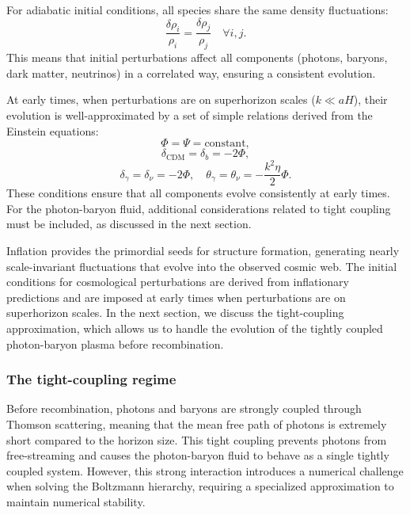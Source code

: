 \documentclass{aa}
\begin{document}
For adiabatic initial conditions, all species share the same density fluctuations:
\begin{equation}
\frac{\delta\rho_i}{\rho_i} = \frac{\delta\rho_j}{\rho_j} \quad \forall i, j.
\end{equation}
This means that initial perturbations affect all components (photons, baryons, dark matter, neutrinos) in a correlated way, ensuring a consistent evolution.

At early times, when perturbations are on superhorizon scales ($ k \ll aH $), their evolution is well-approximated by a set of simple relations derived from the Einstein equations:
\begin{equation}
\Phi = \Psi = \text{constant},
\end{equation}\begin{equation}
\delta_{\text{CDM}} = \delta_b = -2\Phi,
\end{equation}\begin{equation}
\delta_\gamma = \delta_\nu = -2\Phi, \quad \theta_\gamma = \theta_\nu = -\frac{k^2 \eta}{2} \Phi.
\end{equation}
These conditions ensure that all components evolve consistently at early times. For the photon-baryon fluid, additional considerations related to tight coupling must be included, as discussed in the next section.

Inflation provides the primordial seeds for structure formation, generating nearly scale-invariant fluctuations that evolve into the observed cosmic web. The initial conditions for cosmological perturbations are derived from inflationary predictions and are imposed at early times when perturbations are on superhorizon scales. In the next section, we discuss the tight-coupling approximation, which allows us to handle the evolution of the tightly coupled photon-baryon plasma before recombination.
\color{black}






\subsubsection{The tight-coupling regime}
\color{Plum}
Before recombination, photons and baryons are strongly coupled through Thomson scattering, meaning that the mean free path of photons is extremely short compared to the horizon size. This tight coupling prevents photons from free-streaming and causes the photon-baryon fluid to behave as a single tightly coupled system. However, this strong interaction introduces a numerical challenge when solving the Boltzmann hierarchy, requiring a specialized approximation to maintain numerical stability.
\end{document}

